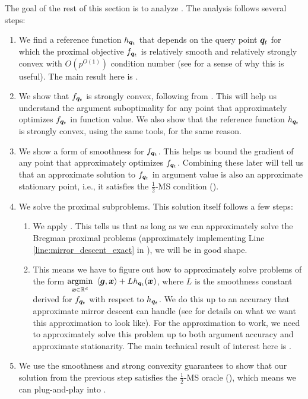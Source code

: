 The goal of the rest of this section is to analyze . The analysis follows several steps:
\begin{enumerate}
    \item We find a reference function $h_{\bm{q}_t}$ that depends on the query point $\bm{q}_t$ for which the proximal objective $f_{\bm{q}_t}$ is relatively smooth and relatively strongly convex with $O(p^{O(1)})$ condition number (see  for a sense of why this is useful). The main result here is .
    \item We show that $f_{\bm{q}_t}$ is strongly convex, following from . This will help us understand the argument suboptimality for any point that approximately optimizes $f_{\bm{q}_t}$ in function value. We also show that the reference function $h_{\bm{q}_t}$ is strongly convex, using the same tools, for the same reason.
    \item We show a form of smoothness for $f_{\bm{q}_t}$. This helps us bound the gradient of any point that approximately optimizes $f_{\bm{q}_t}$. Combining these later will tell us that an approximate solution to $f_{\bm{q}_t}$ in argument value is also an approximate stationary point, i.e., it satisfies the $\frac{1}{2}$-MS condition ().
    \item We solve the proximal subproblems. This solution itself follows a few steps:\begin{enumerate}
        \item We apply . This tells us that as long as we can approximately solve the Bregman proximal problems (approximately implementing Line \ref{line:mirror_descent_exact} in ), we will be in good shape.
        \item This means we have to figure out how to approximately solve problems of the form $\underset{\bm{x}\in\mathbb{R}^d}{\mathrm{argmin}}\  \left\langle \bm{g},\bm{x} \right\rangle + Lh_{\bm{q}_t}(\bm{x})$, where $L$ is the smoothness constant derived for $f_{\bm{q}_t}$ with respect to $h_{\bm{q}_t}$. We do this up to an accuracy that approximate mirror descent can handle (see  for details on what we want this approximation to look like). For the approximation to work, we need to approximately solve this problem up to both argument accuracy and approximate stationarity. The main technical result of interest here is .
    \end{enumerate}
    \item We use the smoothness and strong convexity guarantees to show that our solution from the previous step satisfies the $\frac{1}{2}$-MS oracle (), which means we can plug-and-play into .
\end{enumerate}

